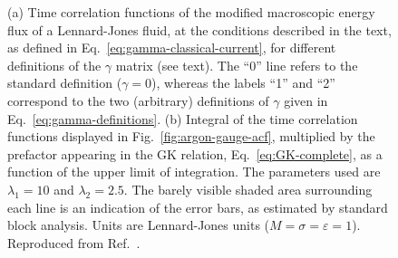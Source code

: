 \begin{figure}
    \begin{center}
    \end{center}
	\caption{(a) Time correlation functions of the modified macroscopic energy flux of a Lennard-Jones fluid, at the conditions described in the text, as defined in Eq.~\eqref{eq:gamma-classical-current}, for different definitions of the $\gamma$ matrix (see text). The ``0'' line refers to the standard definition ($\gamma = 0$), whereas the labels ``1'' and ``2'' correspond to the two (arbitrary) definitions of $\gamma$ given in Eq.~\eqref{eq:gamma-definitions}.
    (b) Integral of the time correlation functions displayed in Fig.~\ref{fig:argon-gauge-acf}, multiplied by the prefactor appearing in the GK relation, Eq.~\eqref{eq:GK-complete}, as a function of the upper limit of integration. 
    The parameters used are $\lambda_1=10$ and $\lambda_2=2.5$. The barely visible shaded area surrounding each line is an indication of the error bars, as estimated by standard block analysis. Units are Lennard-Jones units ($M=\sigma=\varepsilon=1$). Reproduced from Ref.~\cite{Ercole2016}. 
    }
    \label{fig:argon-gauge}
\end{figure}

